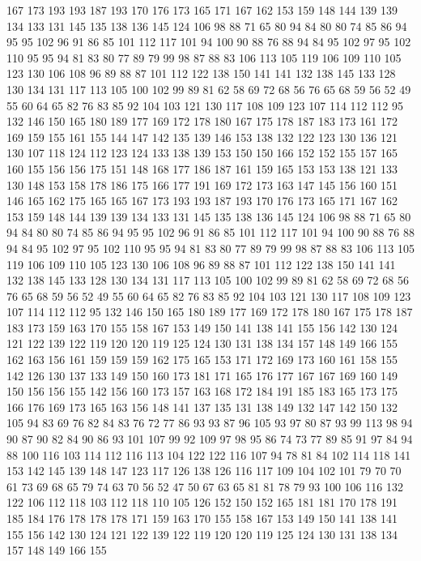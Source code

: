 167 173 193 193 187 193 170 176 173 165 171 167 162 153 159 148 144 139 139 134
133 131 145 135 138 136 145 124 106 98 88 71 65 80 94 84 80 80 74 85
86 94 95 95 102 96 91 86 85 101 112 117 101 94 100 90 88 76 88 94
84 95 102 97 95 102 110 95 95 94 81 83 80 77 89 79 99 98 87 88
83 106 113 105 119 106 109 110 105 123 130 106 108 96 89 88 87 101 112 122
138 150 141 141 132 138 145 133 128 130 134 131 117 113 105 100 102 99 89 81
62 58 69 72 68 56 76 65 68 59 56 52 49 55 60 64 65 82 76 83
85 92 104 103 121 130 117 108 109 123 107 114 112 112 95 132 146 150 165 180
189 177 169 172 178 180 167 175 178 187 183 173 161 172 169 159 155 161 155 144
147 142 135 139 146 153 138 132 122 123 130 136 121 130 107 118 124 112 123 124
133 138 139 153 150 150 166 152 152 155 157 165 160 155 156 156 175 151 148 168
177 186 187 161 159 165 153 153 138 121 133 130 148 153 158 178 186 175 166 177
191 169 172 173 163 147 145 156 160 151 146 165 162 175 165 165 167 173 193 193
187 193 170 176 173 165 171 167 162 153 159 148 144 139 139 134 133 131 145 135
138 136 145 124 106 98 88 71 65 80 94 84 80 80 74 85 86 94 95 95
102 96 91 86 85 101 112 117 101 94 100 90 88 76 88 94 84 95 102 97
95 102 110 95 95 94 81 83 80 77 89 79 99 98 87 88 83 106 113 105
119 106 109 110 105 123 130 106 108 96 89 88 87 101 112 122 138 150 141 141
132 138 145 133 128 130 134 131 117 113 105 100 102 99 89 81 62 58 69 72
68 56 76 65 68 59 56 52 49 55 60 64 65 82 76 83 85 92 104 103
121 130 117 108 109 123 107 114 112 112 95 132 146 150 165 180 189 177 169 172
178 180 167 175 178 187 183 173 159 163 170 155 158 167 153 149 150 141 138 141
155 156 142 130 124 121 122 139 122 119 120 120 119 125 124 130 131 138 134 157
148 149 166 155 162 163 156 161 159 159 159 162 175 165 153 171 172 169 173 160
161 158 155 142 126 130 137 133 149 150 160 173 181 171 165 176 177 167 167 169
160 149 150 156 156 155 142 156 160 173 157 163 168 172 184 191 185 183 165 173
175 166 176 169 173 165 163 156 148 141 137 135 131 138 149 132 147 142 150 132
105 94 83 69 76 82 84 83 76 72 77 86 93 93 87 96 105 93 97 80
87 93 99 113 98 94 90 87 90 82 84 90 86 93 101 107 99 92 109 97
98 95 86 74 73 77 89 85 91 97 84 94 88 100 116 103 114 112 116 113
104 122 122 116 107 94 78 81 84 102 114 118 141 153 142 145 139 148 147 123
117 126 138 126 116 117 109 104 102 101 79 70 70 61 73 69 68 65 79 74
63 70 56 52 47 50 67 63 65 81 81 78 79 93 100 106 116 132 122 106
112 118 103 112 118 110 105 126 152 150 152 165 181 181 170 178 191 185 184 176
178 178 178 171 159 163 170 155 158 167 153 149 150 141 138 141 155 156 142 130
124 121 122 139 122 119 120 120 119 125 124 130 131 138 134 157 148 149 166 155
